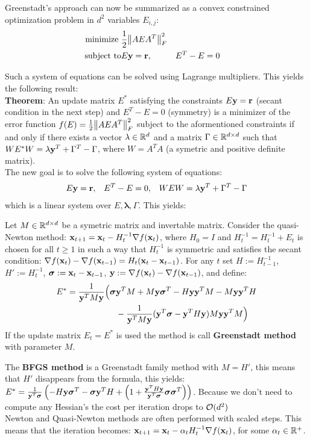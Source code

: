 \begin{framed}
    Greenstadt's approach can now be summarized as a convex constrained optimization problem in $d^2$ variables $E_{i, j}$:
    \begin{align*}
        \text{minimize } &\frac{1}{2}\norm{AEA^T}_F^2 \\
        \text{subject to} & E\mathbf{y} = \mathbf{r}, && E^T - E = 0
    \end{align*}
\end{framed}
Such a system of equations can be solved using Lagrange multipliers. This yields the following result:\\
\textbf{Theorem}: An update matrix $E^*$ satisfying the constraints $E\mathbf{y} = \mathbf{r}$ (secant condition in the next step) and $E^T - E = 0$ (symmetry) is a minimizer of the error function $f(E) = \frac{1}{2}\norm{AEA^T}_F^2$ subject to the aformentioned constraints if and only if there exists a vector $\mathbf{\lambda} \in \mathbb{R}^d$ and a matrix $\Gamma \in \mathbb{R}^{d \times d}$ such that $W E^* W = \mathbf{\lambda} \mathbf{y}^T + \Gamma^T - \Gamma$, where $W = A^T A$ (a symetric and positive definite matrix). \\
The new goal is to solve the following system of equations:
\begin{align*}
        E \mathbf{y} = \mathbf{r}, && E^T - E = 0,  && W E W = \mathbf{\lambda} \mathbf{y}^T + \Gamma^T - \Gamma
\end{align*}
which is a linear system over $E, \mathbf{\lambda}, \Gamma$. This yields: \\
\begin{framed}
    Let $M \in \mathbb{R}^{d \times d}$ be a symetric matrix and invertable matrix. Consider the quasi-Newton method: $\mathbf{x}_{t+1} = \mathbf{x}_t - H_t^{-1} \nabla f(\mathbf{x}_t)$, where $H_0 = I$ and $H_t^{-1} = H_t^{-1} + E_t$ is chosen for all $t \geq 1$ in such a way that $H_t^{-1}$ is symmetric and satisfies the secant condition: $\nabla f(\mathbf{x}_t) - \nabla f(\mathbf{x}_{t-1}) = H_t (\mathbf{x}_t - \mathbf{x}_{t-1})$. For any $t$ set $H := H_{t-1}^{-1}$, $H' := H_t^{-1}$, $\boldsymbol{\sigma} := \mathbf{x}_t - \mathbf{x}_{t-1}$, $\mathbf{y} := \nabla f(\mathbf{x}_t) - \nabla f(\mathbf{x}_{t-1})$, and define: 
    \begin{align*}
        E^* = \frac{1}{\mathbf{y}^T M \mathbf{y}}\Big(\boldsymbol{\sigma} &\mathbf{y}^T M + M \mathbf{y} \boldsymbol{\sigma}^T - H \mathbf{y} \mathbf{y}^T M - M \mathbf{y} \mathbf{y}^T H \\
        &- \frac{1}{\mathbf{y}^T M \mathbf{y}}(\mathbf{y}^T \boldsymbol{\sigma} - \mathbf{y}^T H \mathbf{y})M \mathbf{y} \mathbf{y}^T M \Big)
    \end{align*}
    If the update matrix $E_t = E^*$ is used the method is call \textbf{Greenstadt method} with parameter $M$.
\end{framed}
The \textbf{BFGS method} is a Greenstadt family method with $M = H'$, this means that $H'$ disappears from the formula, this yields: $ E^* = \frac{1}{\mathbf{y}^T \boldsymbol{\sigma}}\left(-H\mathbf{y} \boldsymbol{\sigma}^T - \boldsymbol{\sigma} \mathbf{y}^T H + \left(1 + \frac{\mathbf{y}^T H \mathbf{y}}{\mathbf{y}^T \boldsymbol{\sigma}}\boldsymbol{\sigma} \boldsymbol{\sigma}^T \right) \right)$. Because we don't need to compute any Hessian's the cost per iteration drops to $\mathcal{O}(d^2)$ \\
Newton and Quasi-Newton methods are often performed with scaled steps. This means that the iteration becomes: $\mathbf{x}_{t+1} = \mathbf{x}_t - \alpha_t H_t^{-1} \nabla f(\mathbf{x}_t)$, for some $\alpha_t \in \mathbb{R}^{+}$. 

